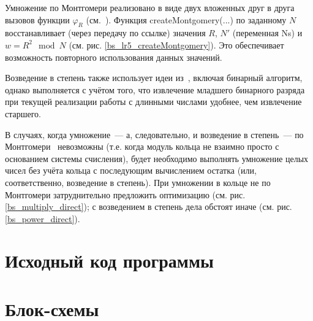 \documentclass[a4paper,12pt]{article} %
\begin{document}
Умножение по Монтгомери реализовано в виде двух вложенных друг в друга вызовов функции $\varphi_R$
(см.~\cite{Glukhov}).
Функция createMontgomery(...) по заданному $N$
восстанавливает (через передачу по ссылке) значения $R$, $N'$ (переменная Ns) и $w = R^2 \mod N$
(см. рис. \ref{bs_lr5_createMontgomery}).
Это обеспечивает возможность повторного использования данных значений.

Возведение в степень также использует идеи из~\cite{Glukhov},
включая бинарный алгоритм, однако выполняется с учётом того,
что извлечение младшего бинарного разряда при текущей реализации
работы с длинными числами удобнее, чем извлечение старшего.

В случаях, когда умножение~--- а, следовательно, и возведение в степень~--- по Монтгомери~\cite{Glukhov}
невозможны (т.е. когда модуль кольца не взаимно просто с основанием системы счисления),
будет необходимо выполнять умножение целых чисел без учёта кольца с последующим вычислением остатка
(или, соответственно, возведение в степень).
При умножении в кольце не по Монтгомери затруднительно предложить оптимизацию (см. рис. \ref{bs_multiply_direct});
с возведением в степень дела обстоят иначе (см. рис. \ref{bs_power_direct}).



\section*{Исходный код программы}










\section*{Блок-схемы}
\end{document}

